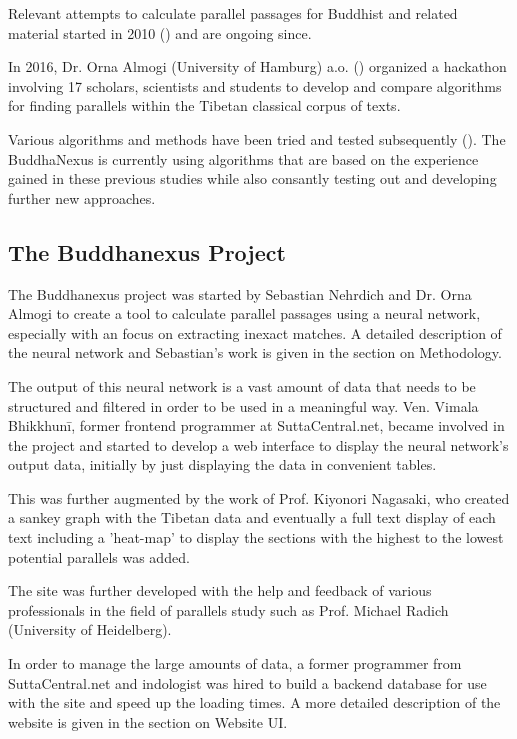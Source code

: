 Relevant attempts to calculate parallel passages for Buddhist and related material started in 2010 (\cite{prasad2010}) and are ongoing since. 

In 2016, Dr. Orna Almogi (University of Hamburg) a.o. (\cite{almogi}) organized a hackathon involving 17 scholars, scientists and students to develop and compare algorithms for finding parallels within the Tibetan classical corpus of texts.

Various algorithms and methods have been tried and tested subsequently (\cite{klein2014}). The BuddhaNexus is currently using algorithms that are based on the experience gained in these previous studies  while also consantly testing out and developing further new approaches.  

\subsection{The Buddhanexus Project}
The Buddhanexus project was started by Sebastian Nehrdich and Dr. Orna Almogi to create a tool to calculate parallel passages using a neural network, especially with an focus on extracting inexact matches. A detailed description of the neural network and Sebastian's work is given in the section on Methodology. 

The output of this neural network is a vast amount of data that needs to be structured and filtered in order to be used in a meaningful way. Ven. Vimala Bhikkhunī, former frontend programmer at SuttaCentral.net, became involved in the project and started to develop a web interface to display the neural network's output data, initially by just displaying the data in convenient tables. 

This was further augmented by the work of Prof. Kiyonori Nagasaki, who created a sankey graph with the Tibetan data and eventually a full text display of each text including a 'heat-map' to display the sections with the highest to the lowest potential parallels was added. 

The site was further developed with the help and feedback of various professionals in the field of parallels study such as Prof. Michael Radich (University of Heidelberg).

In order to manage the large amounts of data, a former programmer from SuttaCentral.net and indologist was hired to build a backend database for use with the site and speed up the loading times. A more detailed description of the website is given in the section on Website UI.

